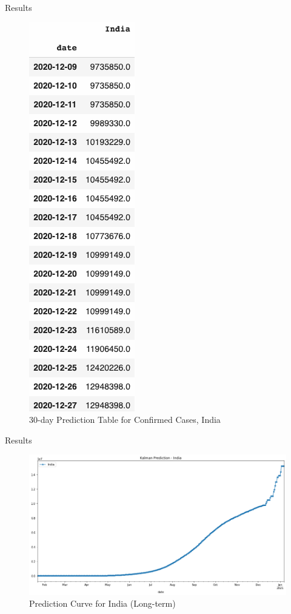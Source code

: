 \documentclass[11pt]{beamer}
\begin{document}
\begin{frame}{Results}
\begin{figure}
\includegraphics[scale=0.3]{kal_30day}
\caption{30-day Prediction Table for Confirmed Cases, India}
\end{figure}
\end{frame}

\begin{frame}{Results}
\begin{figure}
\includegraphics[scale=0.35]{30day_kal}
\caption{Prediction Curve for India (Long-term)}
\end{figure}
\end{frame}
\end{document}
